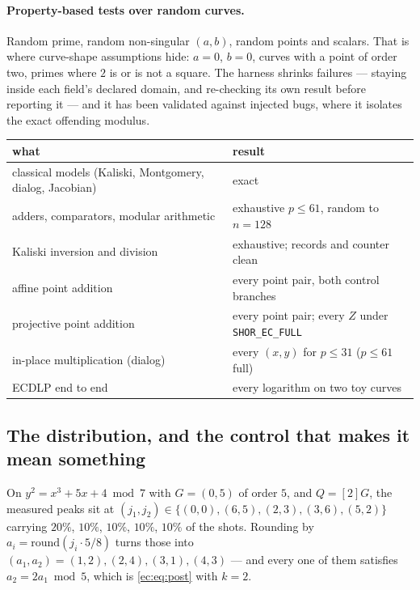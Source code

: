 \documentclass[11pt]{article}
\newcommand{\code}[1]{\texttt{#1}}
\theoremstyle{plain}
\theoremstyle{remark}
\begin{document}
\paragraph{Property-based tests over random curves.}
Random prime, random non-singular $(a,b)$, random points and scalars. That is where curve-shape
assumptions hide: $a=0$, $b=0$, curves with a point of order two, primes where $2$ is or is not a
square. The harness shrinks failures --- staying inside each field's declared domain, and
re-checking its own result before reporting it --- and it has been validated against injected bugs,
where it isolates the exact offending modulus.

\begin{center}\small
\begin{tabular}{@{}ll@{}}
\toprule
what & result\\
\midrule
classical models (Kaliski, Montgomery, dialog, Jacobian) & exact\\
adders, comparators, modular arithmetic & exhaustive $p\le61$, random to $n=128$\\
Kaliski inversion and division & exhaustive; records and counter clean\\
affine point addition & every point pair, both control branches\\
projective point addition & every point pair; every $Z$ under \code{SHOR\_EC\_FULL}\\
in-place multiplication (dialog) & every $(x,y)$ for $p\le31$ ($p\le61$ full)\\
ECDLP end to end & every logarithm on two toy curves\\
\bottomrule
\end{tabular}
\end{center}

\subsection{The distribution, and the control that makes it mean something}\label{ec:sec:post}

On $y^2=x^3+5x+4\bmod7$ with $G=(0,5)$ of order $5$, and $Q=[2]G$, the measured peaks sit at
$(j_1,j_2)\in\{(0,0),(6,5),(2,3),(3,6),(5,2)\}$ carrying $20\%$, $10\%$, $10\%$, $10\%$, $10\%$ of
the shots. Rounding by $a_i=\mathrm{round}(j_i\cdot5/8)$ turns those into $(a_1,a_2) =
(1,2),(2,4),(3,1),(4,3)$ --- and every one of them satisfies $a_2=2a_1 \bmod 5$, which is
\eqref{ec:eq:post} with $k=2$.
\end{document}

